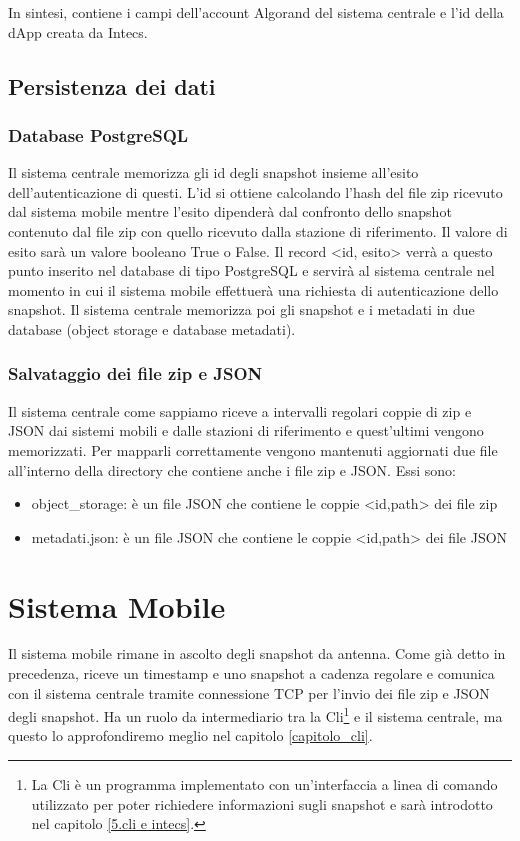 In sintesi, contiene i campi dell'account Algorand del sistema centrale e l'id della dApp creata da Intecs.

\subsection{Persistenza dei dati}
\subsubsection{Database PostgreSQL}
Il sistema centrale memorizza gli id degli snapshot insieme all'esito dell'autenticazione di questi. L'id si ottiene calcolando l'hash del file zip ricevuto dal sistema mobile mentre l'esito dipenderà dal confronto dello snapshot contenuto dal file zip con quello ricevuto dalla stazione di riferimento. Il valore di esito sarà un valore booleano True o False. Il record <id, esito> verrà a questo punto inserito nel database di tipo PostgreSQL e servirà al sistema centrale nel momento in cui il sistema mobile effettuerà una richiesta di autenticazione dello snapshot. Il sistema centrale memorizza poi gli snapshot e i metadati in due database (object storage e database metadati).

\subsubsection{Salvataggio dei file zip e JSON}
Il sistema centrale come sappiamo riceve a intervalli regolari coppie di zip e JSON dai sistemi mobili e dalle stazioni di riferimento e quest'ultimi vengono memorizzati. Per mapparli correttamente vengono mantenuti aggiornati due file all'interno della directory che contiene anche i file zip e JSON. Essi sono:
\begin{itemize}
    \item object\_storage: è un file JSON che contiene le coppie <id,path> dei file zip
    \item metadati.json: è un file JSON che contiene le coppie <id,path> dei file JSON
\end{itemize}

\section{Sistema Mobile}
Il sistema mobile rimane in ascolto degli snapshot da antenna. Come già detto in precedenza, riceve un timestamp e uno snapshot a cadenza regolare e comunica con il sistema centrale tramite connessione TCP per l'invio dei file zip e JSON degli snapshot. Ha un ruolo da intermediario tra la Cli\footnote{La Cli è un programma implementato con un'interfaccia a linea di comando utilizzato per poter richiedere informazioni sugli snapshot e sarà introdotto nel capitolo \ref{5.cli e intecs}.} e il sistema centrale, ma questo lo approfondiremo meglio nel capitolo \ref{capitolo_cli}.

